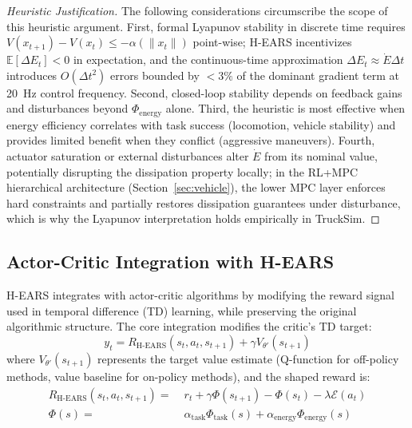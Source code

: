 \documentclass[journal]{IEEEtran}
\begin{document}
\begin{proof}[Heuristic Justification]
		The following considerations circumscribe the scope of this heuristic argument. First, formal Lyapunov stability in discrete time requires $V(x_{t+1}) - V(x_t) \leq -\alpha(\|x_t\|)$ point-wise; H-EARS incentivizes $\mathbb{E}[\Delta E_t]<0$ in expectation, and the continuous-time approximation $\Delta E_t\approx\dot{E}\Delta t$ introduces $O(\Delta t^2)$ errors bounded by $<3\%$ of the dominant gradient term at 20~Hz control frequency. Second, closed-loop stability depends on feedback gains and disturbances beyond $\Phi_{\text{energy}}$ alone. Third, the heuristic is most effective when energy efficiency correlates with task success (locomotion, vehicle stability) and provides limited benefit when they conflict (aggressive maneuvers). Fourth, actuator saturation or external disturbances alter $\dot{E}$ from its nominal value, potentially disrupting the dissipation property locally; in the RL+MPC hierarchical architecture (Section~\ref{sec:vehicle}), the lower MPC layer enforces hard constraints and partially restores dissipation guarantees under disturbance, which is why the Lyapunov interpretation holds empirically in TruckSim.
	\end{proof}
	
	\subsection{Actor-Critic Integration with H-EARS}
	\label{sec:ac_integration}
	
	H-EARS integrates with actor-critic algorithms by modifying the reward signal used in temporal difference (TD) learning, while preserving the original algorithmic structure. The core integration modifies the critic's TD target:
	\begin{equation}
		y_t = R_{\text{H-EARS}}(s_t, a_t, s_{t+1}) + \gamma V_{\theta'}(s_{t+1})
		\label{eq:ac_td_target}
	\end{equation}
	where $V_{\theta'}(s_{t+1})$ represents the target value estimate (Q-function for off-policy methods, value baseline for on-policy methods), and the shaped reward is:
	\begin{equation}
		\begin{split}
			R_{\text{H-EARS}}(s_t, a_t, s_{t+1}) = \; &r_t + \gamma\Phi(s_{t+1}) - \Phi(s_t) - \lambda\mathcal{E}(a_t) \\
			\Phi(s) = \; &\alpha_{\text{task}}\Phi_{\text{task}}(s) + \alpha_{\text{energy}}\Phi_{\text{energy}}(s)
		\end{split}
		\label{eq:hears_reward}
	\end{equation}
	
\end{document}
